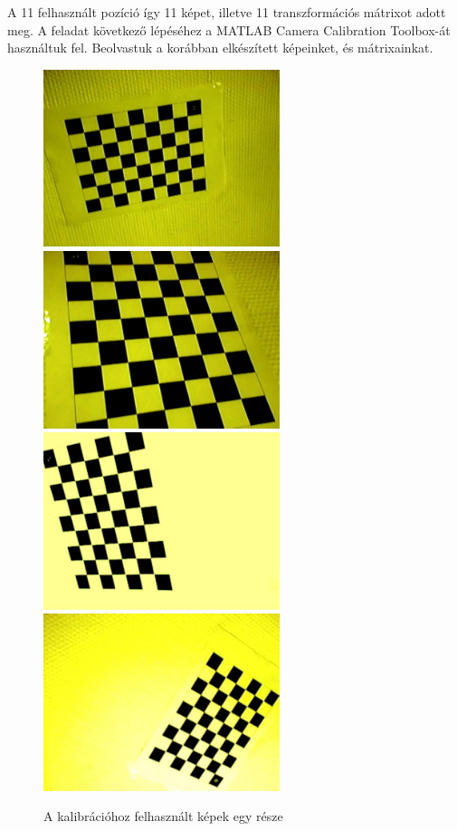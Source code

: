 A 11 felhasznált pozíció így 11 képet, illetve 11 transzformációs mátrixot adott meg.
A feladat következő lépéséhez a MATLAB Camera Calibration Toolbox-át használtuk fel.
Beolvastuk a korábban elkészített képeinket, és mátrixainkat.
\begin{figure}[!h]
	\centering
	\includegraphics[width=69mm, keepaspectratio]{figures/m06/calib_1.jpg}\hspace{5mm}
	\includegraphics[width=69mm, keepaspectratio]{figures/m06/calib_6.jpg}\\\vspace{5mm}
	\includegraphics[width=69mm, keepaspectratio]{figures/m06/calib_10.jpg}\hspace{5mm}
	\includegraphics[width=69mm, keepaspectratio]{figures/m06/calib_4.jpg}
	\caption{A kalibrációhoz felhasznált képek egy része}
	\label{fig:calib}
\end{figure}

